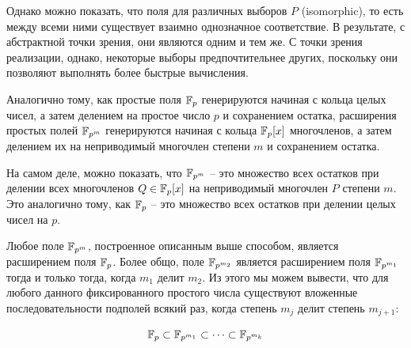 Однако можно показать, что поля для различных выборов $P$  (isomorphic), то есть между всеми ними существует взаимно однозначное соответствие. В результате, с абстрактной точки зрения, они являются одним и тем же. С точки зрения реализации, однако, некоторые выборы предпочтительнее других, поскольку они позволяют выполнять более быстрые вычисления.

\begin{remark}
Аналогично тому, как простые поля $\mathbb{F}_p$ генерируются начиная с кольца целых чисел, а затем делением на простое число $p$ и сохранением остатка, расширения простых полей $\mathbb{F}_{p^m}$ генерируются начиная с кольца $\mathbb{F}_p[x]$ многочленов, а затем делением их на неприводимый многочлен степени $m$ и сохранением остатка.

На самом деле, можно показать, что $\mathbb{F}_{p^m}$ -- это множество всех остатков при делении всех многочленов $Q\in \mathbb{F}_p[x]$ на неприводимый многочлен $P$ степени $m$. Это аналогично тому, как $\mathbb{F}_p$ -- это множество всех остатков при делении целых чисел на $p$.
\end{remark}

Любое поле $\mathbb{F}_{p^m}$, построенное описанным выше способом, является расширением поля $\mathbb{F}_p$. Более общо, поле $\mathbb{F}_{p^{m_2}}$ является расширением поля $\mathbb{F}_{p^{m_1}}$ тогда и только тогда, когда $m_1$ делит $m_2$. Из этого мы можем вывести, что для любого данного фиксированного простого числа существуют вложенные последовательности подполей всякий раз, когда степень $m_j$ делит степень $m_{j+1}$:

\begin{equation}
\mathbb{F}_p \subset \mathbb{F}_{p^{m_1}} \subset \cdots \subset \mathbb{F}_{p^{m_k}}
\end{equation}

